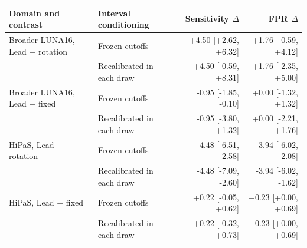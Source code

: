 \begin{tabular}{@{}llrr@{}}
\toprule
Domain and contrast & Interval conditioning & Sensitivity $\Delta$ & FPR $\Delta$ \\
\midrule
Broader LUNA16, Lead $-$ rotation & Frozen cutoffs & +4.50 [+2.62, +6.32] & +1.76 [-0.59, +4.12] \\
 & Recalibrated in each draw & +4.50 [-0.59, +8.31] & +1.76 [-2.35, +5.00] \\
Broader LUNA16, Lead $-$ fixed & Frozen cutoffs & -0.95 [-1.85, -0.10] & +0.00 [-1.32, +1.32] \\
 & Recalibrated in each draw & -0.95 [-3.80, +1.32] & +0.00 [-2.21, +1.76] \\
HiPaS, Lead $-$ rotation & Frozen cutoffs & -4.48 [-6.51, -2.58] & -3.94 [-6.02, -2.08] \\
 & Recalibrated in each draw & -4.48 [-7.09, -2.60] & -3.94 [-6.02, -1.62] \\
HiPaS, Lead $-$ fixed & Frozen cutoffs & +0.22 [-0.05, +0.62] & +0.23 [+0.00, +0.69] \\
 & Recalibrated in each draw & +0.22 [-0.32, +0.73] & +0.23 [+0.00, +0.69] \\
\bottomrule
\end{tabular}

